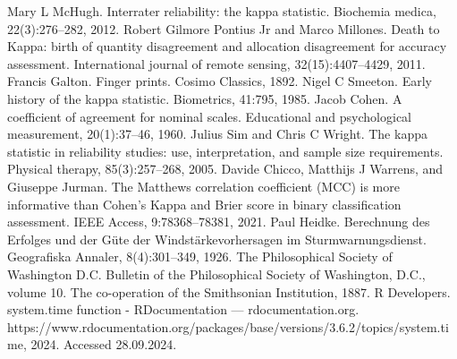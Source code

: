 \documentclass[preprint,12pt]{elsarticle}
\begin{document}
\begin{thebibliography}{000}
 Mary L McHugh. Interrater reliability: the kappa statistic. Biochemia medica, 22(3):276–282, 2012. 
 Robert Gilmore Pontius Jr and Marco Millones. Death to Kappa: birth of quantity disagreement and allocation disagreement for accuracy assessment. International journal of remote sensing, 32(15):4407–4429, 2011. 
 Francis Galton. Finger prints. Cosimo Classics, 1892. 
 Nigel C Smeeton. Early history of the kappa statistic. Biometrics, 41:795, 1985. 
 Jacob Cohen. A coefficient of agreement for nominal scales. Educational and psychological measurement, 20(1):37–46, 1960. 
 Julius Sim and Chris C Wright. The kappa statistic in reliability studies: use, interpretation, and sample size requirements. Physical therapy, 85(3):257–268, 2005. 
 Davide Chicco, Matthijs J Warrens, and Giuseppe Jurman. The Matthews correlation coefficient (MCC) is more informative than Cohen’s Kappa and Brier score in binary classification assessment. IEEE Access, 9:78368–78381, 2021. 
 Paul Heidke. Berechnung des Erfolges und der Güte der Windstärkevorhersagen im Sturmwarnungsdienst. Geografiska Annaler, 8(4):301–349, 1926. 
 The Philosophical Society of Washington D.C. Bulletin of the Philosophical Society of Washington, D.C., volume 10. The co-operation of the Smithsonian Institution, 1887. 
 R Developers. system.time function - RDocumentation — rdocumentation.org. https://www.rdocumentation.org/packages/base/versions/3.6.2/topics/system.time, 2024. Accessed 28.09.2024.
\end{thebibliography}
\end{document}

